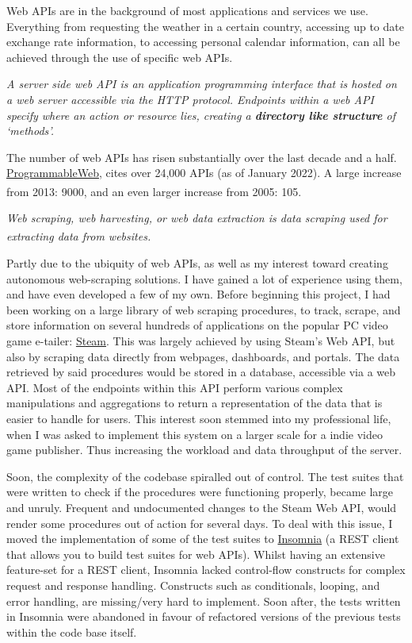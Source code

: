 \documentclass[]{full}
\theoremstyle{definition}
\begin{document}
Web APIs are in the background of most applications and services we use. Everything from requesting the weather in a certain country, accessing up to date exchange rate information, to accessing personal calendar information, can all be achieved through the use of specific web APIs.

\textit{A server side web API is an application programming interface that is hosted on a web server accessible via the HTTP protocol. Endpoints within a web API specify where an action or resource lies, creating a \textbf{directory like structure} of `methods'.}

The number of web APIs has risen substantially over the last decade and a half. \href{https://www.programmableweb.com/category/all/apis}{ProgrammableWeb}, cites over 24,000 APIs (as of January 2022). A large increase from 2013: 9000, and an even larger increase from 2005: 105\textsuperscript{\cite{duvander_2013}}.

\textit{Web scraping, web harvesting, or web data extraction is data scraping used for extracting data from websites\textsuperscript{\cite{web_scraping_wikipedia_2022}}.}

Partly due to the ubiquity of web APIs, as well as my interest toward creating autonomous web-scraping solutions. I have gained a lot of experience using them, and have even developed a few of my own. Before beginning this project, I had been working on a large library of web scraping procedures, to track, scrape, and store information on several hundreds of applications on the popular PC video game e-tailer: \href{https://store.steampowered.com/}{Steam}. This was largely achieved by using Steam's Web API, but also by scraping data directly from webpages, dashboards, and portals. The data retrieved by said procedures would be stored in a database, accessible via a web API. Most of the endpoints within this API perform various complex manipulations and aggregations to return a representation of the data that is easier to handle for users. This interest soon stemmed into my professional life, when I was asked to implement this system on a larger scale for a indie video game publisher. Thus increasing the workload and data throughput of the server.

Soon, the complexity of the codebase spiralled out of control. The test suites that were written to check if the procedures were functioning properly, became large and unruly. Frequent and undocumented changes to the Steam Web API, would render some procedures out of action for several days. To deal with this issue, I moved the implementation of some of the test suites to \href{https://insomnia.rest/}{Insomnia} (a REST client that allows you to build test suites for web APIs). Whilst having an extensive feature-set for a REST client, Insomnia lacked control-flow constructs for complex request and response handling. Constructs such as conditionals, looping, and error handling, are missing/very hard to implement. Soon after, the tests written in Insomnia were abandoned in favour of refactored versions of the previous tests within the code base itself.
\end{document}

